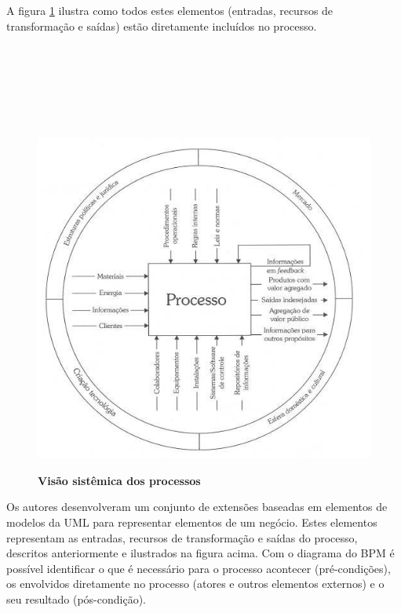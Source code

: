 \documentclass[
	12pt,				%
	openright,			%
	oneside,			%
	a4paper,			%
	chapter=TITLE,		%
	section=TITLE,		%
	english,			%
	french,				%
	spanish,			%
	brazil				%
	]{abntex2}
\begin{document}
A figura \ref{fig-processo} ilustra como todos estes elementos (entradas, recursos de transformação e saídas) estão diretamente incluídos no processo.
\\ \\ \\ \\ \\ \\ \\

\begin{figure}[htb]
	\begin{center}
		\caption{
			\textbf{Visão sistêmica dos processos}
		}\label{fig-processo}
		\includegraphics [scale=0.9]{imagens/processo.jpg}
		\label{fig-processo}
	\end{center}
\end{figure}

Os autores  desenvolveram um conjunto de extensões baseadas em elementos de modelos da UML para representar elementos de um negócio. Estes elementos representam as entradas, recursos de transformação e saídas do processo, descritos anteriormente e ilustrados na figura acima. Com o diagrama do BPM é possível identificar o que é necessário para o processo acontecer (pré-condições), os envolvidos diretamente no processo (atores e outros elementos externos) e o seu resultado (pós-condição).
\end{document}
